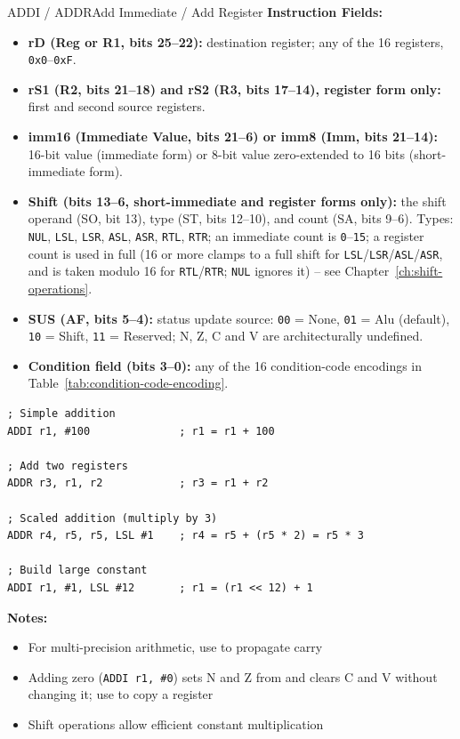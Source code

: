 \begin{instructionbox}{ADDI / ADDR}{Add Immediate / Add Register}
	\textbf{Instruction Fields:}
	\begin{itemize}
		\item \textbf{rD (Reg or R1, bits 25--22):} destination register; any of the 16 registers, \texttt{0x0}--\texttt{0xF}.
		\item \textbf{rS1 (R2, bits 21--18) and rS2 (R3, bits 17--14), register form only:} first and second source registers.
		\item \textbf{imm16 (Immediate Value, bits 21--6) or imm8 (Imm, bits 21--14):} 16-bit value (immediate form) or 8-bit
		      value zero-extended to 16 bits (short-immediate form).
		\item \textbf{Shift (bits 13--6, short-immediate and register forms only):} the shift operand (SO, bit 13), type (ST, bits 12--10), and count (SA, bits 9--6). Types:
		      \texttt{NUL}, \texttt{LSL},
		      \texttt{LSR}, \texttt{ASL}, \texttt{ASR}, \texttt{RTL}, \texttt{RTR}; an immediate count is
		      \texttt{0}--\texttt{15}; a register count is used in full (16 or more clamps to a full shift for \texttt{LSL}/\texttt{LSR}/\texttt{ASL}/\texttt{ASR}, and is taken modulo 16 for \texttt{RTL}/\texttt{RTR}; \texttt{NUL} ignores it) -- see Chapter~\ref{ch:shift-operations}.
		\item \textbf{SUS (AF, bits 5--4):} status update source: \texttt{00} = None, \texttt{01} = Alu (default), \texttt{10} = Shift, \texttt{11} =
		      Reserved; N, Z, C and V are architecturally undefined.
		\item \textbf{Condition field (bits 3--0):} any of the 16 condition-code encodings in
		      Table~\ref{tab:condition-code-encoding}.
	\end{itemize}

	\begin{example}
		\begin{lstlisting}
; Simple addition
ADDI r1, #100              ; r1 = r1 + 100

; Add two registers
ADDR r3, r1, r2            ; r3 = r1 + r2

; Scaled addition (multiply by 3)
ADDR r4, r5, r5, LSL #1    ; r4 = r5 + (r5 * 2) = r5 * 3

; Build large constant
ADDI r1, #1, LSL #12       ; r1 = (r1 << 12) + 1
		\end{lstlisting}
		\caption{Basic and Scaled Addition}
	\end{example}

	\textbf{Notes:}
	\begin{itemize}
		\item For multi-precision arithmetic, use  to propagate carry
		\item Adding zero (\texttt{ADDI r1, \#0}) sets N and Z from  and clears C and V without changing it; use
		       to copy a register
		\item Shift operations allow efficient constant multiplication
	\end{itemize}
\end{instructionbox}

